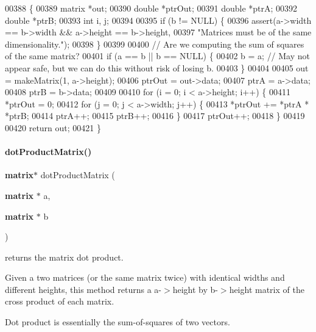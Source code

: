 \begin{DoxyCode}
00388                                                 \{
00389   matrix *out;
00390   \textcolor{keywordtype}{double} *ptrOut;
00391   \textcolor{keywordtype}{double} *ptrA;
00392   \textcolor{keywordtype}{double} *ptrB;
00393   \textcolor{keywordtype}{int} i, j;
00394 
00395   \textcolor{keywordflow}{if} (b != NULL) \{
00396     assert(a->width == b->width && a->height == b->height,
00397            \textcolor{stringliteral}{"Matrices must be of the same dimensionality."});
00398   \}
00399 
00400   \textcolor{comment}{// Are we computing the sum of squares of the same matrix?}
00401   \textcolor{keywordflow}{if} (a == b || b == NULL) \{
00402     b = a; \textcolor{comment}{// May not appear safe, but we can do this without risk of losing b.}
00403   \}
00404 
00405   out = makeMatrix(1, a->height);
00406   ptrOut = out->data;
00407   ptrA = a->data;
00408   ptrB = b->data;
00409 
00410   \textcolor{keywordflow}{for} (i = 0; i < a->height; i++) \{
00411     *ptrOut = 0;
00412     \textcolor{keywordflow}{for} (j = 0; j < a->width; j++) \{
00413       *ptrOut += *ptrA * *ptrB;
00414       ptrA++;
00415       ptrB++;
00416     \}
00417     ptrOut++;
00418   \}
00419 
00420   \textcolor{keywordflow}{return} out;
00421 \}
\end{DoxyCode}
\mbox{\label{a00041_a0b568a64e81a56779c2141b424475976}} 
\paragraph{dot\+Product\+Matrix()}
{\footnotesize\ttfamily \textbf{ matrix}$\ast$ dot\+Product\+Matrix (\begin{DoxyParamCaption}\item[{\textbf{ matrix} $\ast$}]{a,  }\item[{\textbf{ matrix} $\ast$}]{b }\end{DoxyParamCaption})}



returns the matrix dot product. 

Given a two matrices (or the same matrix twice) with identical widths and different heights, this method returns a a-\/$>$height by b-\/$>$height matrix of the cross product of each matrix.

Dot product is essentially the sum-\/of-\/squares of two vectors.

